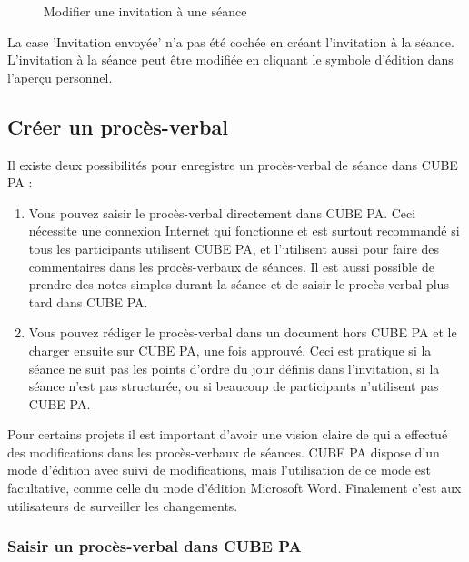 \begin{figure}[H]
\caption{Modifier une invitation à une séance}
\end{figure}

\begin{small}
La case 'Invitation envoyée' n'a pas été cochée en créant l'invitation à la séance. L'invitation à la séance peut être modifiée en cliquant le symbole d'édition dans l'aperçu personnel.
\end{small}


\subsection{Créer un procès-verbal}

Il existe deux possibilités pour enregistre un procès-verbal de séance dans CUBE PA :

\begin{enumerate}
\item
Vous pouvez saisir le procès-verbal directement dans CUBE PA. Ceci nécessite une connexion Internet qui fonctionne et est surtout recommandé si tous les participants utilisent CUBE PA, et l'utilisent aussi pour faire des commentaires dans les procès-verbaux de séances.
Il est aussi possible de prendre des notes simples durant la séance et de saisir le procès-verbal plus tard dans CUBE PA.
\item
Vous pouvez rédiger le procès-verbal dans un document hors CUBE PA et le charger ensuite sur CUBE PA, une fois approuvé.
Ceci est pratique si la séance ne suit pas les points d'ordre du jour définis dans l'invitation, si la séance n'est pas structurée, ou si beaucoup de participants n'utilisent pas CUBE PA.
\end{enumerate}

Pour certains projets il est important d'avoir une vision claire de qui a effectué des modifications dans les procès-verbaux de séances. CUBE PA dispose d'un mode d'édition avec suivi de modifications, mais l'utilisation de ce mode est facultative, comme celle du mode d'édition Microsoft Word.
Finalement c'est aux utilisateurs de surveiller les changements.

\subsubsection{Saisir un procès-verbal dans CUBE PA}

